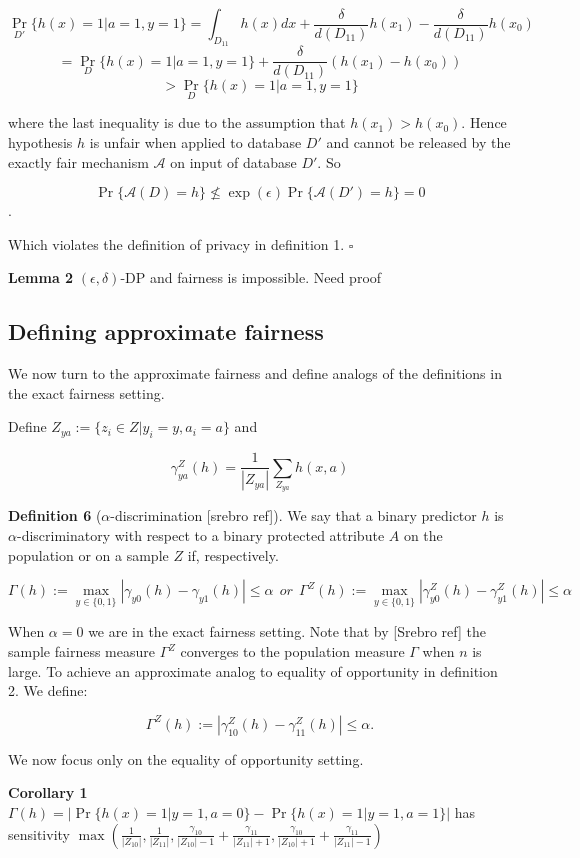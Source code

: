 \documentclass[format = sigconf]{acmart}
\newcommand{\A}{\mathcal{A}}
\newcommand{\1}{\mathbbm{1}}
\theoremstyle{definition}
\begin{document}
$$\Pr_{D'}\{h(x) = 1 | a = 1, y=1\} = \int_{D_{11}}h(x)dx + \frac{\delta}{d(D_{11})} h(x_1) - \frac{\delta}{d(D_{11})} h(x_0) $$
$$= \Pr_{D}\{h(x) = 1 | a = 1, y=1\} + \frac{\delta}{d(D_{11})} (h(x_1) - h(x_0))$$
$$>  \Pr_{D}\{h(x) = 1 | a = 1, y=1\}$$

where the last inequality is due to the assumption that $h(x_1) > h(x_0)$. Hence hypothesis $h$ is unfair when applied to database $D'$ and cannot be released by the exactly fair mechanism $\A$ on input of database $D'$. So

$$\Pr\{\mathcal{A}(D) = h\} \not\leq \exp(\epsilon)\Pr\{\mathcal{A}(D') = h\} = 0$$.

Which violates the definition of privacy in definition 1. $\square$
\vspace{0.5cm}

{\bf Lemma 2} $(\epsilon, \delta)$-DP and fairness is impossible. Need proof


\subsection{Defining approximate fairness}
We now turn to the approximate fairness and define analogs of the definitions in the exact fairness setting.

Define $Z_{ya} := \{z_i \in Z | y_i = y, a_i = a \}$ and

$$\gamma_{ya}^Z(h) = \frac{1}{|Z_{ya}|} \sum_{Z_{ya}} h(x,a)$$


{\bf Definition 6} ($\alpha$-discrimination [srebro ref]). We say that a binary predictor $h$ is $\alpha$-discriminatory with respect to a binary protected attribute $A$ on the population or on a sample $Z$ if, respectively.

$$\Gamma(h) := \max_{y\in \{0,1\}}|\gamma_{y0}(h) - \gamma_{y1}(h)| \leq \alpha ~~ or ~~ \Gamma^Z(h) := \max_{y\in \{0,1\}}|\gamma_{y0}^Z(h) - \gamma_{y1}^Z(h)| \leq \alpha$$


When $\alpha = 0$ we are in the exact fairness setting. Note that by [Srebro ref] the sample fairness measure $\Gamma^Z$ converges to the population measure $\Gamma$ when $n$ is large. To achieve an approximate analog to equality of opportunity in definition 2. We define:

$$\Gamma^Z(h) := |\gamma_{10}^Z(h) - \gamma_{11}^Z(h)| \leq \alpha.$$

We now focus only on the equality of opportunity setting.

{\bf Corollary 1} $\Gamma(h) = |\Pr\{h(x) = 1 | y=1, a =0\} - \Pr\{h(x) = 1 | y = 1, a = 1\}|$ has sensitivity $\max(\frac{1}{|Z_{10}|},\frac{1}{|Z_{11}|}, \frac{\gamma_{10}}{|Z_{10}|-1} + \frac{\gamma_{11}}{|Z_{11}|+1}, \frac{\gamma_{10}}{|Z_{10}|+1} + \frac{\gamma_{11}}{|Z_{11}|-1})$
\end{document}
